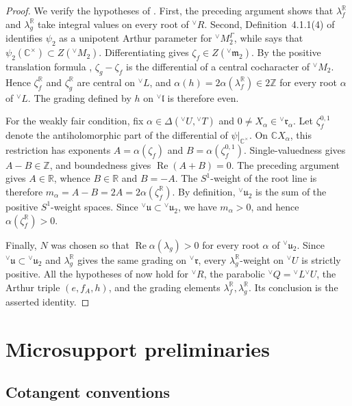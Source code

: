 \documentclass[10pt]{amsart}
\numberwithin{equation}{section}
\theoremstyle{plain}
\theoremstyle{definition}
\theoremstyle{remark}
\newcommand{\CC}{\mathbb C}
\newcommand{\RR}{\mathbb R}
\newcommand{\ZZ}{\mathbb Z}
\newcommand{\fm}{\mathfrak m}
\newcommand{\fr}{\mathfrak r}
\newcommand{\fu}{\mathfrak u}
\newcommand{\vT}{{}^{\vee}T}
\newcommand{\vL}{{}^{\vee}L}
\newcommand{\vM}{{}^{\vee}M}
\newcommand{\vQ}{{}^{\vee}Q}
\newcommand{\vU}{{}^{\vee}U}
\newcommand{\vR}{{}^{\vee}R}
\newcommand{\vfm}{{}^{\vee}\fm}
\newcommand{\vfr}{{}^{\vee}\fr}
\newcommand{\vfu}{{}^{\vee}\fu}
\begin{document}
\begin{proof}
We verify the hypotheses of \cite[Theorem~A.2.1]{AIMV26}. First, the
preceding argument shows that $\lambda_f^{\mathbb R}$ and
$\lambda_g^{\mathbb R}$ take integral values on every root of $\vR$.
Second, Definition~4.1.1(4) of \cite{AIMV26} identifies $\psi_2$ as a
unipotent Arthur parameter for $\vM_2^\Gamma$, while
\cite[Definition~2.3.3]{AIMV26} says that
$\psi_2(\CC^\times)\subset Z(\vM_2)$. Differentiating gives
$\zeta_f\in Z(\vfm_2)$. By the positive
translation formula \cite[(4.6.1)]{AIMV26}, $\zeta_g-\zeta_f$ is the
differential of a central cocharacter of $\vM_2$. Hence
$\zeta_f^{\mathbb R}$ and
$\zeta_g^{\mathbb R}$ are central on $\vL$, and
$\alpha(h)=2\alpha(\lambda_f^{\mathbb R})\in2\ZZ$ for every root $\alpha$
of $\vL$. The grading defined by $h$ on ${}^\vee\mathfrak l$ is therefore even.

For the weakly fair condition, fix $\alpha\in\Delta(\vU,\vT)$ and
$0\neq X_\alpha\in\vfr_\alpha$. Let $\zeta_f^{0,1}$ denote the
antiholomorphic part of the differential of
$\psi|_{\CC^\times}$. On $\CC X_\alpha$, this restriction has exponents
$A=\alpha(\zeta_f)$ and
$B=\alpha(\zeta_f^{0,1})$. Single-valuedness gives $A-B\in\ZZ$, and
boundedness gives $\operatorname{Re}(A+B)=0$. The preceding argument gives
$A\in\RR$, whence $B\in\RR$ and $B=-A$. The $S^1$-weight of the root line is
therefore $m_\alpha=A-B=2A=2\alpha(\zeta_f^{\mathbb R})$. By definition,
$\vfu_2$ is the sum of the positive $S^1$-weight spaces.
Since $\vfu\subset\vfu_2$, we have $m_\alpha>0$, and hence
$\alpha(\zeta_f^{\mathbb R})>0$.

Finally, $N$ was chosen so that $\operatorname{Re}\alpha(\lambda_g)>0$ for
every root $\alpha$ of $\vfu_2$. Since $\vfu\subset\vfu_2$ and
$\lambda_g^{\mathbb R}$ gives the same grading on $\vfr$, every
$\lambda_g^{\mathbb R}$-weight on $\vU$ is strictly positive. All the
hypotheses of \cite[Theorem~A.2.1]{AIMV26} now hold for $\vR$, the
parabolic $\vQ=\vL\vU$, the Arthur triple $(e,f_A,h)$, and the grading
elements $\lambda_f^{\mathbb R},\lambda_g^{\mathbb R}$. Its conclusion is
the asserted identity.
\end{proof}

\section{Microsupport preliminaries}

\subsection{Cotangent conventions}\label{sec:cotangent-conventions}
\end{document}
